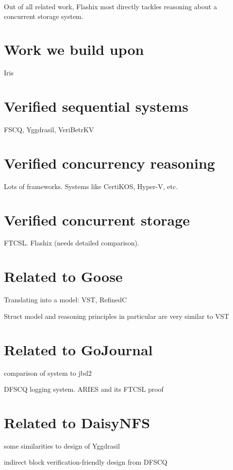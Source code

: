 Out of all related work, Flashix most directly tackles reasoning about a
concurrent storage system.

\section{Work we build upon}%

Iris

\section{Verified sequential systems}

FSCQ, Yggdrasil, VeriBetrKV

\section{Verified concurrency reasoning}

Lots of frameworks. Systems like CertiKOS, Hyper-V, etc.

\section{Verified concurrent
storage}

FTCSL. Flashix (needs detailed comparison).

\section{Related to Goose}

Translating into a model: VST, RefinedC

Struct model and reasoning principles in particular are very similar to
VST

\section{Related to GoJournal}

comparison of system to jbd2

DFSCQ logging system. ARIES and its FTCSL proof

\section{Related to DaisyNFS}

some similarities to design of Yggdrasil

indirect block verification-friendly design from DFSCQ
